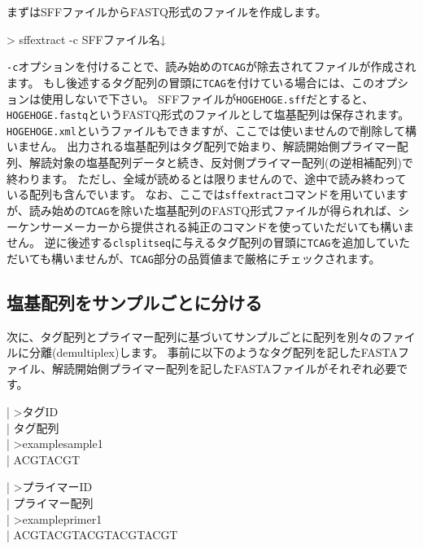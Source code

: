 \documentclass[titlepage,10pt,a4paper]{jsbook}
\newenvironment{content}{\begin{shaded}\vspace{-1em}\raggedright\ttfamily\footnotesize\setlength{\baselineskip}{1.4em}}{\end{shaded}\vspace{-1em}}
\newenvironment{cmd}{\begin{oframed}\raggedright\ttfamily\footnotesize\setlength{\baselineskip}{1.4em}}{\end{oframed}\vspace{-1em}}
\begin{document}
まずはSFFファイルからFASTQ形式のファイルを作成します。

\begin{cmd}
{\textgreater} sff{\textunderscore}extract -c SFFファイル名↓
\end{cmd}

\texttt{-c}オプションを付けることで、読み始めの\texttt{TCAG}が除去されてファイルが作成されます。
もし後述するタグ配列の冒頭に\texttt{TCAG}を付けている場合には、このオプションは使用しないで下さい。
SFFファイルが\texttt{HOGEHOGE.sff}だとすると、\texttt{HOGEHOGE.fastq}というFASTQ形式のファイルとして塩基配列は保存されます。
\texttt{HOGEHOGE.xml}というファイルもできますが、ここでは使いませんので削除して構いません。
出力される塩基配列はタグ配列で始まり、解読開始側プライマー配列、解読対象の塩基配列データと続き、反対側プライマー配列(の逆相補配列)で終わります。
ただし、全域が読めるとは限りませんので、途中で読み終わっている配列も含んでいます。
なお、ここでは\texttt{sff{\textunderscore}extract}コマンドを用いていますが、読み始めの\texttt{TCAG}を除いた塩基配列のFASTQ形式ファイルが得られれば、シーケンサーメーカーから提供される純正のコマンドを使っていただいても構いません。
逆に後述する\texttt{clsplitseq}に与えるタグ配列の冒頭に\texttt{TCAG}を追加していただいても構いませんが、\texttt{TCAG}部分の品質値まで厳格にチェックされます。

\subsection{塩基配列をサンプルごとに分ける}

次に、タグ配列とプライマー配列に基づいてサンプルごとに配列を別々のファイルに分離(demultiplex)します。
事前に以下のようなタグ配列を記したFASTAファイル、解読開始側プライマー配列を記したFASTAファイルがそれぞれ必要です。

\begin{content}
| {\textgreater}タグID\\
| タグ配列\\
| {\textgreater}examplesample1\\
| ACGTACGT
\end{content}

\begin{content}
| {\textgreater}プライマーID\\
| プライマー配列\\
| {\textgreater}exampleprimer1\\
| ACGTACGTACGTACGTACGT
\end{content}
\end{document}
